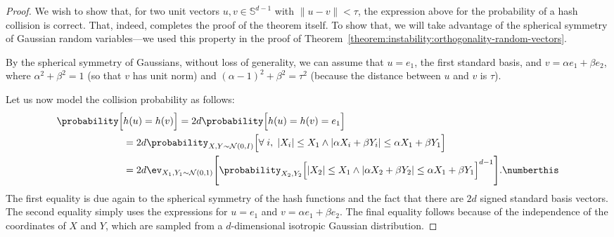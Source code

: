 \begin{proof}
    We wish to show that, for two unit vectors $u, v \in \mathbb{S}^{d-1}$ with $\lVert u - v \rVert < \tau$,
    the expression above for the probability of a hash collision is correct.
    That, indeed, completes the proof of the theorem itself. To show that, we will
    take advantage of the spherical symmetry of Gaussian random variables---we used this property
    in the proof of Theorem~\ref{theorem:instability:orthogonality-random-vectors}.

    By the spherical symmetry of Gaussians, without loss of generality, we can assume that
    $u = e_1$, the first standard basis, and $v = \alpha e_1 + \beta e_2$,
    where $\alpha^2 + \beta^2 = 1$ (so that $v$ has unit norm) and $(\alpha - 1)^2 + \beta^2 = \tau^2$
    (because the distance between $u$ and $v$ is $\tau$).

    Let us now model the collision probability as follows:
    \begin{align*}
        \probability\Big[ &h(u) = h(v) \Big] = 2d \probability\Big[ h(u) = h(v) = e_1 \Big] \\
        &= 2d \probability_{X, Y \sim \mathcal{N}(0, I)}\Big[ \forall \; i,\; \lvert X_i \rvert \leq X_1 \land
        \lvert \alpha X_i + \beta Y_i \rvert \leq \alpha X_1 + \beta Y_1 \Big] \\
        &= 2d \ev_{X_1, Y_1 \sim \mathcal{N}(0, 1)} \Bigg[ 
            \probability_{X_2, Y_2}\Big[ \lvert X_2 \rvert \leq X_1 \land \lvert \alpha X_2 + \beta Y_2 \rvert \leq \alpha X_1 + \beta Y_1 \Big]^{d-1}
        \Bigg]. \numberthis \label{equation:lsh:cross-polytope:collision-prob}
    \end{align*}
    The first equality is due again to the spherical symmetry of the hash functions
    and the fact that there are $2d$ signed standard basis vectors.
    The second equality simply uses the expressions for $u=e_1$ and $v=\alpha e_1 + \beta e_2$.
    The final equality follows because of the independence of the coordinates of $X$ and $Y$,
    which are sampled from a $d$-dimensional isotropic Gaussian distribution.


\end{proof}
